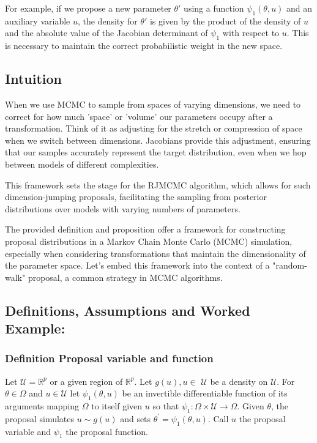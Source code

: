 \documentclass[10pt]{article}
\begin{document}
For example, if we propose a new parameter \(\theta'\) using a function \(\psi_1(\theta, u)\) and an auxiliary variable \(u\), the density for \(\theta'\) is given by the product of the density of \(u\) and the absolute value of the Jacobian determinant of \(\psi_1\) with respect to \(u\). This is necessary to maintain the correct probabilistic weight in the new space.

\subsection*{Intuition}
When we use MCMC to sample from spaces of varying dimensions, we need to correct for how much 'space' or 'volume' our parameters occupy after a transformation. Think of it as adjusting for the stretch or compression of space when we switch between dimensions. Jacobians provide this adjustment, ensuring that our samples accurately represent the target distribution, even when we hop between models of different complexities.

This framework sets the stage for the RJMCMC algorithm, which allows for such dimension-jumping proposals, facilitating the sampling from posterior distributions over models with varying numbers of parameters.

The provided definition and proposition offer a framework for constructing proposal distributions in a Markov Chain Monte Carlo (MCMC) simulation, especially when considering transformations that maintain the dimensionality of the parameter space. Let's embed this framework into the context of a "random-walk" proposal, a common strategy in MCMC algorithms.

\subsection*{Definitions, Assumptions and Worked Example:}

\subsubsection*{Definition Proposal variable and function}
Let $\mathcal{U}=\mathbb{R}^p$ or a given region of $\mathbb{R}^p$. Let $g(u), u \in$ $\mathcal{U}$ be a density on $\mathcal{U}$. For $\theta \in \Omega$ and $u \in \mathcal{U}$ let $\psi_1(\theta, u)$ be an invertible differentiable function of its arguments mapping $\Omega$ to itself given $u$ so that $\psi_1: \Omega \times \mathcal{U} \rightarrow \Omega$. Given $\theta$, the proposal simulates $u \sim g(u)$ and sets $\theta^{\prime}=\psi_1(\theta, u)$. Call $u$ the proposal variable and $\psi_1$ the proposal function.
\end{document}
